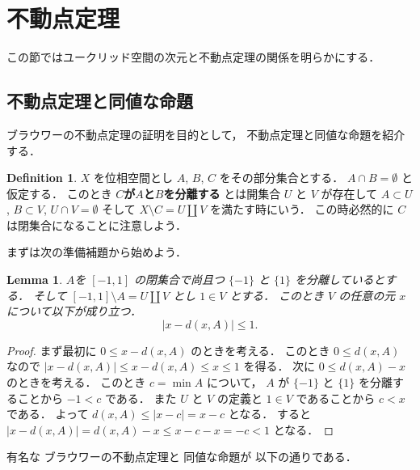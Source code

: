 \documentclass[leqno, a4paper, 12pt]{jsarticle}
\theoremstyle{plain}
\newtheorem{lem}[thm]{Lemma}
\theoremstyle{definition}
\newtheorem{df}{Definition}[section]
\theoremstyle{remark}
\newcommand{\yoemph}[1]{\textbf{#1}}
\numberwithin{equation}{section}
\begin{document}
\section{不動点定理}\label{sec:fxptthm}
この節ではユークリッド空間の次元と不動点定理の関係を明らかにする．
\subsection{不動点定理と同値な命題}\label{subsec:douchi}

ブラウワーの不動点定理の証明を目的として，
不動点定理と同値な命題を紹介する．
\begin{df}
$X$
を位相空間とし
$A$, 
$B$, 
$C$
をその部分集合とする．
$A\cap B=\emptyset$
と仮定する．
このとき
\yoemph{$C$が$A$と$B$を分離する}
とは開集合
$U$
と
$V$
が存在して
$A\subset U$, 
$B\subset V$, 
$U\cap V=\emptyset$
そして
$X\setminus C=U\coprod V$
を満たす時にいう．
この時必然的に
$C$
は閉集合になることに注意しよう．
\end{df}


まずは次の準備補題から始めよう．
\begin{lem}\label{lem:kisokiso}
$A$を
$[-1, 1]$
の閉集合で尚且つ
$\{-1\}$
と
$\{1\}$
を分離しているとする．
そして
$[-1, 1]\setminus A=U\coprod V$
とし
$1\in V$
とする．
このとき
$V$
の任意の元
$x$
について以下が成り立つ．
\[
|x-d(x, A)|\le 1. 
\]
\end{lem}
\begin{proof}
まず最初に
$0\le x-d(x, A)$
のときを考える．
このとき
$0\le d(x, A)$
なので
$|x-d(x, A)|\le x-d(x, A)\le x\le 1$
を得る．
次に
$0\le d(x, A)-x$
のときを考える．
このとき
$c=\min A$
について，
$A$
が
$\{-1\}$
と
$\{1\}$
を分離することから
$-1<c$
である．
また
$U$
と
$V$
の定義と
$1\in V$
であることから
$c<x$
である．
よって
$d(x, A)\le |x-c|=x-c$
となる．
すると
$|x-d(x, A)|= d(x, A)-x\le x-c-x=-c<1$
となる．
\end{proof}



有名な
ブラウワーの不動点定理と
同値な命題が
以下の通りである．
\end{document}
